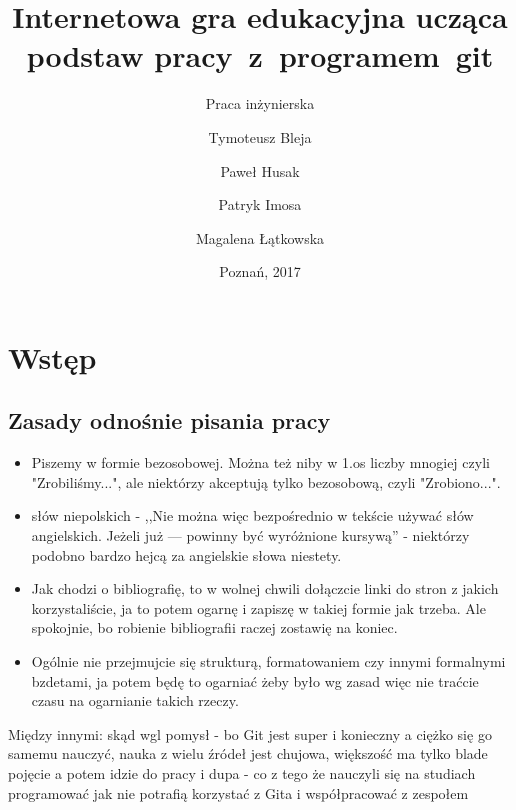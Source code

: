 \documentclass[11pt,a4paper,polish,thesis]{dcsbook}
\begin{document}
	
	\author{Tymoteusz Bleja \and Paweł Husak \and Patryk Imosa \and Magalena Łątkowska}
	\title{Internetowa gra edukacyjna ucząca podstaw pracy~z~programem~git}
	\subtitle{Praca inżynierska}
	\date{Poznań, 2017}
	\maketitle
	\frontmatter
	\tableofcontents{}
	\mainmatter
	
	\chapter{Wstęp}
	
	\section{Zasady odnośnie pisania pracy}
	
	\begin{itemize}
	
		\item Piszemy w formie bezosobowej. Można też niby w 1.os liczby mnogiej czyli "Zrobiliśmy...", ale niektórzy akceptują tylko bezosobową, czyli "Zrobiono...".
		
		\item słów niepolskich - ,,Nie można więc bezpośrednio
		w tekście używać słów angielskich. Jeżeli już — powinny być wyróżnione kursywą'' - niektórzy podobno bardzo hejcą za angielskie słowa niestety.
			
		\item Jak chodzi o bibliografię, to w wolnej chwili dołączcie linki do stron z jakich korzystaliście, ja to potem ogarnę i zapiszę w takiej formie jak trzeba. Ale spokojnie, bo robienie bibliografii raczej zostawię na koniec.
		
		\item Ogólnie nie przejmujcie się strukturą, formatowaniem czy innymi formalnymi bzdetami, ja potem będę to ogarniać żeby było wg zasad więc nie traćcie czasu na ogarnianie takich rzeczy.
	\end{itemize}
	
	Między innymi: 
	skąd wgl pomysł - bo Git jest super i konieczny a ciężko się go samemu nauczyć, nauka z wielu źródeł jest chujowa, większość ma tylko blade pojęcie a potem idzie do pracy i dupa - co z tego że nauczyli się na studiach programować jak nie potrafią korzystać z Gita i współpracować z zespołem
		
\end{document}
